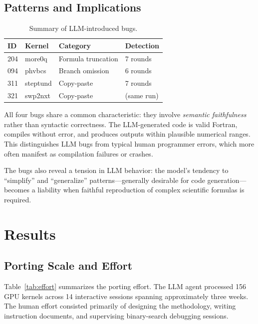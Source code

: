 \documentclass[conference]{IEEEtran}
\begin{document}
\subsection{Patterns and Implications}

\begin{table}[t]
\centering
\caption{Summary of LLM-introduced bugs.}
\label{tab:bugs}
\begin{tabular}{llll}
\toprule
ID & Kernel & Category & Detection \\
\midrule
204 & more0q & Formula truncation & 7 rounds \\
094 & phvbcs & Branch omission & 6 rounds \\
311 & steptund & Copy-paste & 7 rounds \\
321 & swp2nxt & Copy-paste & (same run) \\
\bottomrule
\end{tabular}
\end{table}

All four bugs share a common characteristic: they involve \emph{semantic
faithfulness} rather than syntactic correctness. The LLM-generated code is
valid Fortran, compiles without error, and produces outputs within plausible
numerical ranges. This distinguishes LLM bugs from typical human programmer
errors, which more often manifest as compilation failures or crashes.

The bugs also reveal a tension in LLM behavior: the model's tendency to
``simplify'' and ``generalize'' patterns---generally desirable for code
generation---becomes a liability when faithful reproduction of complex
scientific formulas is required.

\section{Results}
\label{sec:results}

\subsection{Porting Scale and Effort}

Table~\ref{tab:effort} summarizes the porting effort. The LLM agent
processed 156 GPU kernels across 14 interactive sessions spanning
approximately three weeks. The human effort consisted primarily of designing
the methodology, writing instruction documents, and supervising
binary-search debugging sessions.
\end{document}

